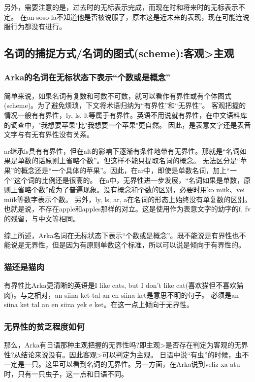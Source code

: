 另外，需要注意的是，过去时的无标表示完成，而现在时和将来时的无标表示不定。
在an soso la不知道他是否被说服了，原本这是近未来的表现，现在可能连说服行为都没有进行。

\subsection{名词的捕捉方式/名词的图式(scheme):客观>主观}

\subsubsection{Arka的名词在无标状态下表示“个数或是概念”}

简单来说，如果名词有复数和可数不可数，就可以看作有界性或有个体图式(scheme)。为了避免烦琐，下文将术语归纳为“有界性”和“无界性”。
客观把握的情况一般有有界性，ly, ls, lt等属于有界性。英语不用说就有界性，在中文语料库的调查中，"我想要苹果"比"我想要一个苹果"更自然。
因此，是表意文字还是表音文字与有无有界性没有关系。

ar继承ls具有有界性，但在alt的影响下逐渐有条件地带有无界性。那就是“名词如果是单数的话原则上省略个数”。但这样不能只提取名词的概念。
无法区分是“苹果”的概念还是“一个具体的苹果”。因此，在ar中，即使是单数名词，加上“一个”这个词的比例还是很高的。
在a中，无界性进一步发展，“名词如果是单数，原则上省略个数”成为了普遍现象。没有概念和个数的区别，必要时用ko miik、vei miik等数字表示个数。
另外，ly, ls, ar, a在名词的形态上始终没有单复数的区别。也就是说，不存在apple和apples那样的对立。这是使用作为表意文字的幼字的f, fv的残留，与中文等相同。

综上所述，Arka名词在无标状态下表示“个数或是概念”。既不能说是有界性也不能说是无界性，但是因为有原则单数这个标准，所以可以说是倾向于有界性的。
\subsubsection{猫还是猫肉}

有界性比Arka更清晰的英语是I like cats, but I don't like cat(喜欢猫但不喜欢猫肉)。与之相对，an siina ket tal an en siina ket是意思不明的句子。
必须是an siina ket tal an en siina yek e ket。在这一点上倾向于无界性。

\subsubsection{无界性的贫乏程度如何}

那么，Arka有日语那种主观把握的无界性吗?即主观>是否存在判定为客观的无界性?从结论来说没有。因此客观>可以判定为主观。
日语中说“有虫”的时候，虫不一定是一只。这里可以看到名词的无界性。另一方面，在Arka说到veliz xa atu时，只有一只虫子，这一点和日语不同。

